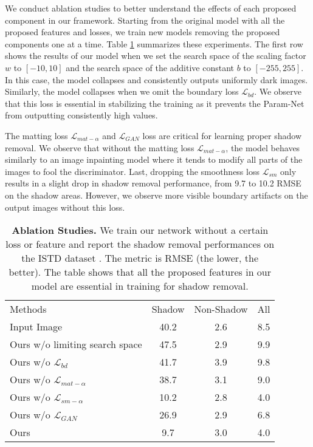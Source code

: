 \documentclass[runningheads]{llncs}
\def\mL{\mathcal{L}}
\begin{document}
We conduct  ablation studies to better understand the effects of each proposed component in our framework. Starting from the original model with all the proposed features and losses, we train new  models removing the proposed components one at a time. Table \ref{table:abl} summarizes these experiments. The first row shows the results of our model when we set the search space of the scaling factor $w$ to $[-10,10]$ and the search space of the additive constant $b$ to $[-255,255]$. In this case, the model collapses and consistently outputs uniformly dark images. Similarly, the model collapses when we omit the boundary loss $\mL_{bd}$. We observe that this loss is essential in stabilizing the training as it prevents the Param-Net from outputting consistently high values. 
\par The matting loss $\mL_{mat-\alpha}$ and  $\mL_{GAN}$ loss are critical for learning  proper shadow removal. We observe that without the matting loss $\mL_{mat-\alpha}$, the model behaves similarly to an image inpainting model where it tends to modify all parts of the images to fool the discriminator.
Last, dropping the smoothness loss $\mL_{sm}$ only results in a  slight drop in shadow removal performance, from 9.7 to 10.2  RMSE on the shadow areas. However, we observe more visible boundary artifacts on the output images without this loss. \setlength{\tabcolsep}{4pt}
\begin{table}[t]
\begin{center}
\caption{\textbf{Ablation Studies.} We train our network without a certain loss or feature and report the shadow removal performances on the ISTD dataset \cite{Wang_2018_CVPR}. The metric is RMSE (the lower, the better). The table shows that all the proposed features in our model are essential in training for shadow removal.}
\label{table:abl}
\begin{tabular}{lccc}
\hline\noalign{\smallskip}
Methods       & Shadow& Non-Shadow& All  \\ 
\noalign{\smallskip}
\midrule
\noalign{\smallskip}
Input Image  & 40.2  & 2.6 & 8.5\\ 
\midrule
Ours w/o limiting search space  &47.5  &2.9&9.9\\
Ours w/o $\mL_{bd}$  &41.7  &3.9 &9.8\\ 
Ours w/o $\mL_{mat-\alpha}$  & 38.7 &3.1 &9.0\\
Ours w/o $\mL_{sm-\alpha}$  & 10.2  &2.8 &4.0\\
Ours w/o $\mL_{GAN}$ & 26.9  &2.9 &6.8\\
\midrule
Ours  & 9.7  &3.0 &4.0\\
\hline
\end{tabular}
\end{center}
\end{table}
\setlength{\tabcolsep}{1.4pt}
\end{document}
